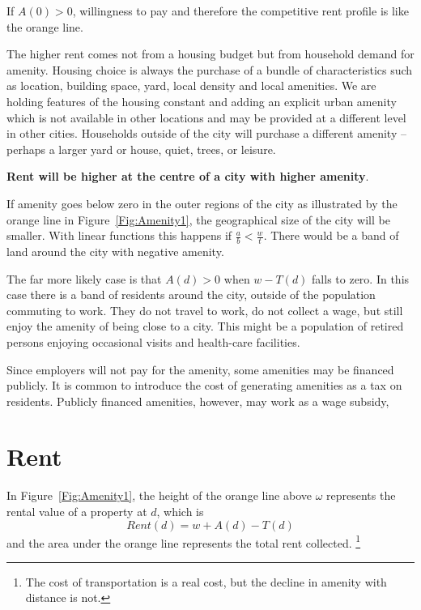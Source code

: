 If $A(0)>0$, willingness to pay and therefore the competitive rent profile is like the orange line.  
  
The  higher rent comes not from a housing budget but from household demand for amenity.  Housing choice is always the purchase of  a bundle of characteristics such as location, building space, yard, local density and local amenities.  We are holding features of the housing constant and adding an explicit urban amenity which is not available in other locations and may be provided at a different level in other cities.  Households outside of the city will purchase a different amenity -- perhaps a larger yard or house, quiet,  trees, or leisure. 
  
  \textbf{Rent will be higher at the centre of a city with higher amenity}.   
    
   
If  amenity goes below zero in the outer regions of the city as illustrated by the orange line  in Figure~\ref{Fig:Amenity1}, the geographical size of the  city will be smaller.  With  linear functions this happens if $\frac{a}{b} < \frac{w}{t}$. There would be a band of land around the city with negative amenity. 
  
The far more likely case is that $A(d) > 0$ when $w-T(d)$ falls to zero. In this case there is a band of  residents around the city, outside of the population commuting to work. They do not travel to work,  do not collect a wage, but still enjoy the amenity of being close to a city. This might be a population of retired persons enjoying occasional visits and health-care facilities.





Since employers will not pay for the amenity, some amenities may be financed publicly. It is common to introduce the cost of generating amenities as a tax on residents. Publicly financed amenities, however, may work as a wage subsidy,  	

\section{Rent}
In Figure~\ref{Fig:Amenity1}, the height of the orange line above $\omega$ represents the rental value of a property at $d$, which is 
\begin{equation}
Rent(d)  =  w  + A(d) - T(d)	
\label{Eqn:Rent-at-d}\end{equation}
 and the area under the orange line represents the total rent collected.
 \footnote{The cost of transportation is a real cost, but the decline in amenity with distance is not.}
 
